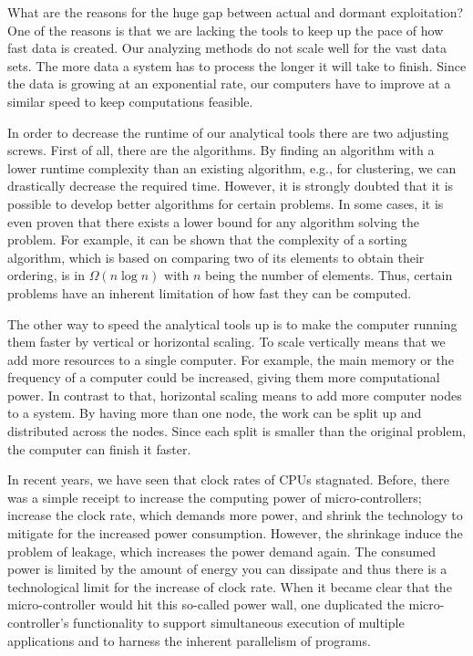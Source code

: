 What are the reasons for the huge gap between actual and dormant exploitation?
One of the reasons is that we are lacking the tools to keep up the pace of how fast data is created.
Our analyzing methods do not scale well for the vast data sets.
The more data a system has to process the longer it will take to finish.
Since the data is growing at an exponential rate, our computers have to improve at a similar speed to keep computations feasible.

In order to decrease the runtime of our analytical tools there are two adjusting screws.
First of all, there are the algorithms.
By finding an algorithm with a lower runtime complexity than an existing algorithm, e.g., for clustering, we can drastically decrease the required time.
However, it is strongly doubted that it is possible to develop better algorithms for certain problems.
In some cases, it is even proven that there exists a lower bound for any algorithm solving the problem.
For example, it can be shown that the complexity of a sorting algorithm, which is based on comparing two of its elements to obtain their ordering, is in $\Omega\left(n\log n\right)$ with $n$ being the number of elements.
Thus, certain problems have an inherent limitation of how fast they can be computed.

The other way to speed the analytical tools up is to make the computer running them faster by vertical or horizontal scaling.
To scale vertically means that we add more resources to a single computer.
For example, the main memory or the frequency of a computer could be increased, giving them more computational power.
In contrast to that, horizontal scaling means to add more computer nodes to a system.
By having more than one node, the work can be split up and distributed across the nodes.
Since each split is smaller than the original problem, the computer can finish it faster.

In recent years, we have seen that clock rates of CPUs stagnated.
Before, there was a simple receipt to increase the computing power of micro-controllers; increase the clock rate, which demands more power, and shrink the technology to mitigate for the increased power consumption.
However, the shrinkage induce the problem of leakage, which increases the power demand again.
The consumed power is limited by the amount of energy you can dissipate and thus there is a technological limit for the increase of clock rate.
When it became clear that the micro-controller would hit this so-called power wall, one duplicated the micro-controller's functionality to support simultaneous execution of multiple applications and to harness the inherent parallelism of programs.

